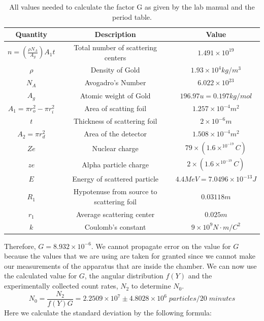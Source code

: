 \begin{table}[H]
\begin{center}
\begin{tabular}{|c|c|c|}\hline
Quantity & Description & Value\\ \hline
 $n=\left(\frac{\rho N_A}{A_g}\right)A_1 t$ & Total number of scattering centers& $1.491\times10^{19}$ \\ \hline
 $\rho$ & Density of Gold &$1.93\times10^4 kg/m^3$ \\ \hline
$N_A$ & Avogadro's Number &  $6.022\times10^{23}$\\ \hline
$A_g$ & Atomic weight of Gold & $196.97 u= 0.197 kg/mol$ \\ \hline
$A_1=\pi r_o^2-\pi r_i^2 $ & Area of scatting foil& $1.257\times10^{-4} m^2$ \\ \hline
 $t$ & Thickness of scattering foil & $2\times10^{-6} m$\\ \hline
$A_2=\pi r_d^2$ & Area of the detector & $1.508\times10^{-4}m^2$\\ \hline
$Ze$ & Nuclear charge &$79\times (1.6\times^10^{-19} C)$\\ \hline
$ze$ & Alpha particle charge & $2\times(1.6\times^10^{-19} C)$\\ \hline
$E$ & Energy of scattered particle &$4.4MeV=7.0496\times10^{-13}J$\\ \hline
$R_1$ & Hypotenuse from source to scattering foil& $0.03118m$\\ \hline
$r_1$ & Average scattering center & $0.025 m$ \\ \hline
$k$ & Coulomb's constant & $9\times10^9 N\cdot m/ C^2$\\ \hline

\end{tabular}
\caption{All values needed to calculate the factor G as given by the lab manual and the period table.}
\end{center}
\end{table}
Therefore, $G=8.932\times10^{-6}$. We cannot propagate error on the value for $G$ because the values that we are using are taken for granted since we cannot make our measurements of the apparatus that are inside the chamber. We can now use the calculated value for $G$, the angular distribution $f(Y)$ and the experimentally collected count rates, $N_2$ to determine $N_0$. 
\begin{equation} N_0=\frac{N_2}{f(Y)G}= 2.2509\times10^7\pm4.8028\times10^6\;particles/20\;minutes\end{equation} 
Here we calculate the standard deviation by the following formula:
